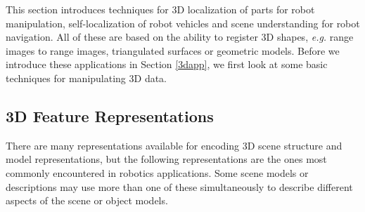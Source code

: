 \documentclass[twocolumn,oneside]{book}
\begin{document}
This section introduces techniques for 3D localization of parts for
robot manipulation, self-localization of robot vehicles and
scene understanding for robot navigation.
All of these are based on the ability to register 3D shapes, {\it e.g.}
range images to range images, triangulated surfaces or geometric models.
Before we introduce these applications in Section \ref{3dapp}, we first look
at some basic techniques for manipulating 3D data.

\subsection{3D Feature Representations}

There are many representations available for encoding 3D scene structure
and model representations, but the following representations are
the ones most commonly encountered in robotics applications.
Some scene models or descriptions may use more than one of these
simultaneously to describe different aspects of the scene or object models.
\end{document}
